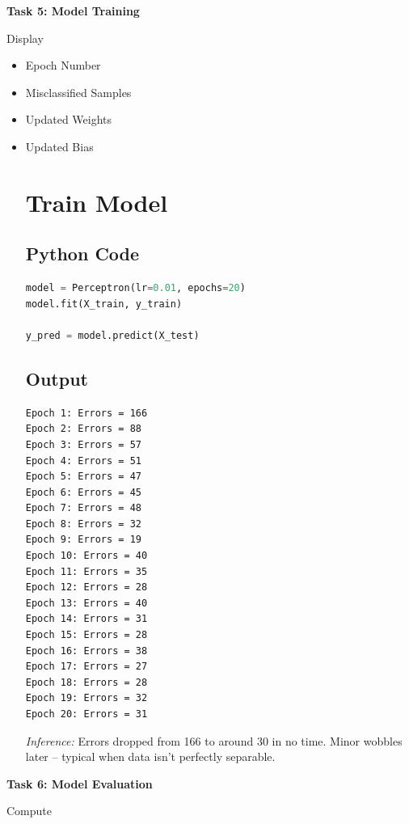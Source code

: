 \documentclass[11pt]{article}
\begin{document}
\vspace{2mm}

\textbf{Task 5: Model Training}

Display

\begin{itemize}
\item Epoch Number
\item Misclassified Samples
\item Updated Weights
\item Updated Bias
\section{Train Model}

\subsection{Python Code}

\begin{lstlisting}[language=Python]
model = Perceptron(lr=0.01, epochs=20)
model.fit(X_train, y_train)

y_pred = model.predict(X_test)
\end{lstlisting}

\subsection{Output}

\begin{verbatim}
Epoch 1: Errors = 166
Epoch 2: Errors = 88
Epoch 3: Errors = 57
Epoch 4: Errors = 51
Epoch 5: Errors = 47
Epoch 6: Errors = 45
Epoch 7: Errors = 48
Epoch 8: Errors = 32
Epoch 9: Errors = 19
Epoch 10: Errors = 40
Epoch 11: Errors = 35
Epoch 12: Errors = 28
Epoch 13: Errors = 40
Epoch 14: Errors = 31
Epoch 15: Errors = 28
Epoch 16: Errors = 38
Epoch 17: Errors = 27
Epoch 18: Errors = 28
Epoch 19: Errors = 32
Epoch 20: Errors = 31

\end{verbatim}
\textit{Inference:} Errors dropped from 166 to around 30 in no time. Minor wobbles later – typical when data isn't perfectly separable.
\end{itemize}

\vspace{2mm}

\textbf{Task 6: Model Evaluation}

Compute
\end{document}
